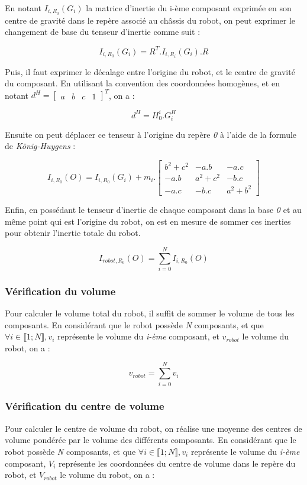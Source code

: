 				En notant $I_{i, R_0}(G_i)$ la matrice d'inertie du i-ème composant exprimée en son centre de gravité dans le repère associé au châssis du robot, on peut exprimer le changement de base du tenseur d'inertie comme suit :

				$$I_{i, R_0}(G_i) = R^T.I_{i, R_i}(G_i).R$$

				Puis, il faut exprimer le décalage entre l'origine du robot, et le centre de gravité du composant. En utilisant la convention des coordonnées homogènes, et en notant $d^H = \begin{bmatrix}a & b & c & 1\end{bmatrix}^T$, on a :

				$$d^H = H_0^i . G_i^H$$

				Ensuite on peut déplacer ce tenseur à l'origine du repère \textit{0} à l'aide de la formule de \textit{König-Huygens} :

				$$I_{i, R_0}(O) = I_{i, R_0}(G_i) + m_i.\begin{bmatrix} b^2 + c^2 & -a.b & -a.c \\ -a.b & a^2 + c^2 & -b.c \\ -a.c & -b.c & a^2 + b^2 \end{bmatrix}$$

				Enfin, en possédant le tenseur d'inertie de chaque composant dans la base \textit{0} et au même point qui est l'origine du robot, on est en mesure de sommer ces inerties pour obtenir l'inertie totale du robot.

				$$I_{robot, R_0}(O) = \sum_{i=0}^N I_{i, R_0}(O)$$

			\subsubsection{Vérification du volume}

				Pour calculer le volume total du robot, il suffit de sommer le volume de tous les composants. En considérant que le robot possède \textit{N} composants, et que $\forall i \in \llbracket 1; N \rrbracket, v_i$ représente le volume du \textit{i-ème} composant, et $v_{robot}$ le volume du robot, on a :

				$$v_{robot} = \sum_{i=0}^{N}v_i$$

			\subsubsection{Vérification du centre de volume}

				Pour calculer le centre de volume du robot, on réalise une moyenne des centres de volume pondérée par le volume des différents composants. En considérant que le robot possède \textit{N} composants, et que $\forall i \in \llbracket 1; N \rrbracket, v_i$ représente le volume du \textit{i-ème} composant, $V_i$ représente les coordonnées du centre de volume dans le repère du robot, et $V_{robot}$ le volume du robot, on a :

